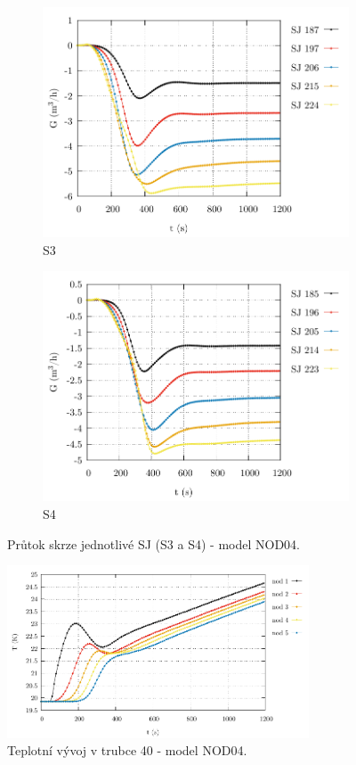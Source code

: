 \begin{figure}[H]
	\centering
	\begin{subfigure}{0.5\textwidth}
		\centering
		\includegraphics[width=\textwidth, trim={0cm 0cm 0cm 0cm}, clip]{./05_TH_model_VR_1/grafy/G_time_nod_04_2.pdf}
		\caption{S3}
		\label{fig:nod_04_mass_flow_rate_horizontal_s3}
	\end{subfigure}%
	\hfill
	\begin{subfigure}{0.5\textwidth}
		\centering
		\includegraphics[width=\textwidth, trim={0cm 0cm 0cm 0cm}, clip]{./05_TH_model_VR_1/grafy/G_time_nod_04_3.pdf}
		\caption{S4}
		\label{fig:nod_04_mass_flow_rate_horizontal_s4}
	\end{subfigure}%
	\caption{Průtok skrze jednotlivé SJ (S3 a S4) - model NOD04.}
\end{figure}
 \begin{figure}[H]
 	\centering
 	\includegraphics[width=0.8\textwidth]{./05_TH_model_VR_1/grafy/tempf_nod_04_1.pdf}
 	\caption{Teplotní vývoj v trubce 40 - model NOD04.}
 \end{figure}
 
 
 
 
 